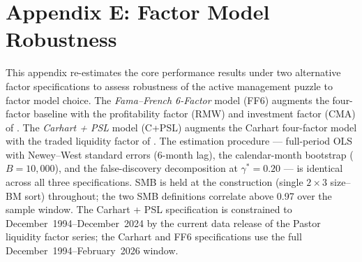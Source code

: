 \documentclass[12pt]{article}
\begin{document}







\clearpage
\section*{Appendix E: Factor Model Robustness}
\label{app:factor_robust}
\setcounter{table}{0}
\renewcommand{\thetable}{E.\arabic{table}}
\setcounter{figure}{0}
\renewcommand{\thefigure}{E.\arabic{figure}}

This appendix re-estimates the core performance results under two alternative
factor specifications to assess robustness of the active management puzzle to
factor model choice. The \textit{Fama--French 6-Factor} model (FF6) augments
the \textcite{Carhart1997} four-factor baseline with the profitability factor
(RMW) and investment factor (CMA) of \textcite{FamaFrench2015}. The
\textit{Carhart + PSL} model (C+PSL) augments the Carhart four-factor model
with the traded liquidity factor of \textcite{PastorStambaugh2003}. The
estimation procedure --- full-period OLS with Newey--West standard errors
(6-month lag), the \textcite{FamaFrench2010} calendar-month bootstrap
($B = 10{,}000$), and the \textcite{BarrasScailletWermers2010} false-discovery
decomposition at $\gamma^{*} = 0.20$ --- is identical across all three
specifications. SMB is held at the \textcite{FamaFrench1993} construction
(single $2 \times 3$ size--BM sort) throughout; the two SMB definitions
correlate above 0.97 over the sample window. The Carhart + PSL specification
is constrained to December~1994--December~2024 by the current data release
of the Pastor liquidity factor series; the Carhart and FF6 specifications
use the full December~1994--February~2026 window.


\clearpage


\clearpage


\clearpage
\end{document}
